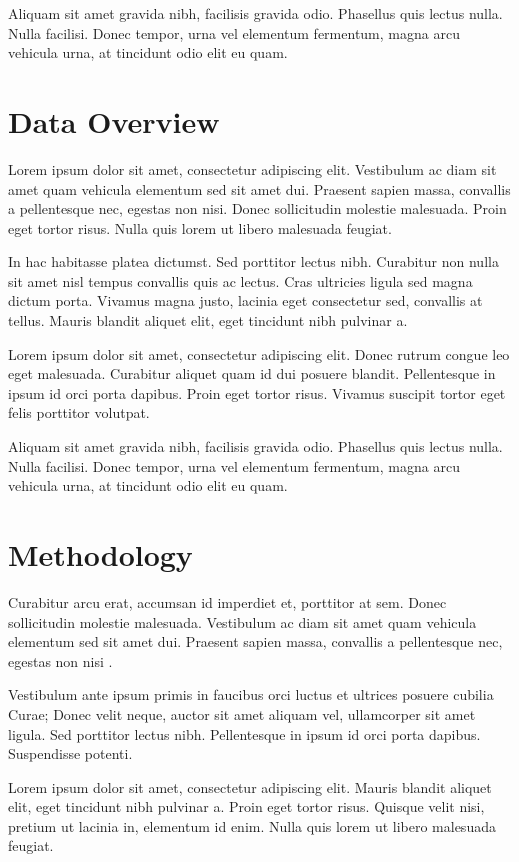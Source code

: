\documentclass[12pt,twocolumn]{article}
\begin{document}
Aliquam sit amet gravida nibh, facilisis gravida odio. Phasellus quis lectus nulla. Nulla facilisi. Donec tempor, urna vel elementum fermentum, magna arcu vehicula urna, at tincidunt odio elit eu quam.

\section{Data Overview}

Lorem ipsum dolor sit amet, consectetur adipiscing elit. Vestibulum ac diam sit amet quam vehicula elementum sed sit amet dui. Praesent sapien massa, convallis a pellentesque nec, egestas non nisi. Donec sollicitudin molestie malesuada. Proin eget tortor risus. Nulla quis lorem ut libero malesuada feugiat.

In hac habitasse platea dictumst. Sed porttitor lectus nibh. Curabitur non nulla sit amet nisl tempus convallis quis ac lectus. Cras ultricies ligula sed magna dictum porta. Vivamus magna justo, lacinia eget consectetur sed, convallis at tellus. Mauris blandit aliquet elit, eget tincidunt nibh pulvinar a.

Lorem ipsum dolor sit amet, consectetur adipiscing elit. Donec rutrum congue leo eget malesuada. Curabitur aliquet quam id dui posuere blandit. Pellentesque in ipsum id orci porta dapibus. Proin eget tortor risus. Vivamus suscipit tortor eget felis porttitor volutpat.

Aliquam sit amet gravida nibh, facilisis gravida odio. Phasellus quis lectus nulla. Nulla facilisi. Donec tempor, urna vel elementum fermentum, magna arcu vehicula urna, at tincidunt odio elit eu quam.


\section{Methodology}

Curabitur arcu erat, accumsan id imperdiet et, porttitor at sem. Donec sollicitudin molestie malesuada. Vestibulum ac diam sit amet quam vehicula elementum sed sit amet dui. Praesent sapien massa, convallis a pellentesque nec, egestas non nisi \citet{krizhevsky2012imagenet}.

Vestibulum ante ipsum primis in faucibus orci luctus et ultrices posuere cubilia Curae; Donec velit neque, auctor sit amet aliquam vel, ullamcorper sit amet ligula. Sed porttitor lectus nibh. Pellentesque in ipsum id orci porta dapibus. Suspendisse potenti.

Lorem ipsum dolor sit amet, consectetur adipiscing elit. Mauris blandit aliquet elit, eget tincidunt nibh pulvinar a. Proin eget tortor risus. Quisque velit nisi, pretium ut lacinia in, elementum id enim. Nulla quis lorem ut libero malesuada feugiat.
\end{document}
